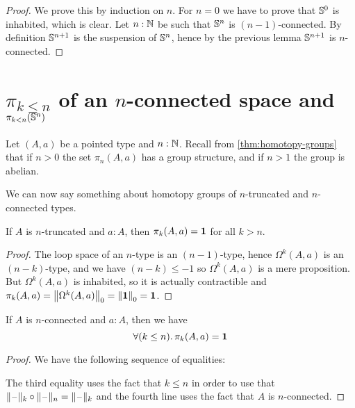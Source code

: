 \begin{proof}
  We prove this by induction on $n$.
  For $n=0$ we have to prove that $\Sn^0$ is inhabited, which is clear.
  Let $n:\N$ be such that $\Sn^n$ is $(n-1)$-connected. By definition $\Sn^{n+1}$
  is the suspension of $\Sn^n$, hence by the previous lemma $\Sn^{n+1}$ is
  $n$-connected.
\end{proof}

\section{\texorpdfstring{$\pi_{k \le n}$}{π\_(k≤n)} of an \texorpdfstring{$n$}{n}-connected space and \texorpdfstring{$\pi_{k < n}(\Sn ^n)$}{π\_(k<n)(Sⁿ)}}
\label{sec:pik-le-n}

Let $(A,a)$ be a pointed type and $n:\N$.  Recall from
\autoref{thm:homotopy-groups} that if $n>0$ the set $\pi_n(A,a)$ has a group
structure, and if $n>1$ the group is abelian.

We can now say something about homotopy groups of $n$-truncated and
$n$-connected types.

\begin{lem}
  If $A$ is $n$-truncated and $a:A$, then $\pi_k(A,a)=\unit$ for all $k>n$.
\end{lem}

\begin{proof}
  The loop space of an $n$-type  is an
  $(n-1)$-type, hence $\Omega^k(A,a)$ is an $(n-k)$-type, and we have
  $(n-k)\le-1$ so $\Omega^k(A,a)$ is a mere proposition. But $\Omega^k(A,a)$ is inhabited,
  so it is actually contractible and
  $\pi_k(A,a)=\trunc0{\Omega^k(A,a)}=\trunc0{\unit}=\unit$.
\end{proof}

\begin{lem} \label{lem:pik-nconnected}
  If $A$ is $n$-connected and $a:A$, then we have
  \[\fall{k\le{}n} \pi_k(A,a)=\unit\]
\end{lem}

\begin{proof}
  We have the following sequence of equalities:
  The third equality uses the fact that $k\le{}n$ in order to use that
  $\truncf k\circ\truncf n=\truncf k$ and the fourth line uses the fact that $A$ is
  $n$-connected.
\end{proof}

